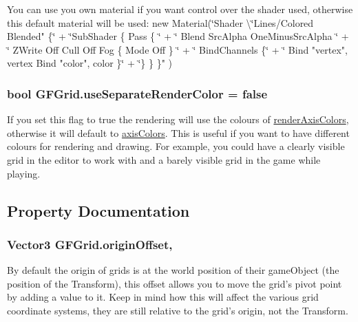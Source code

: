 You can use you own material if you want control over the shader used, otherwise this default material will be used\+: {\ttfamily  new Material(\char`\"{}\+Shader \textbackslash{}\char`\"{}Lines/\+Colored Blended" \{\char`\"{} +
    \char`\"{}Sub\+Shader \{ Pass \{ \char`\"{} +
    \char`\"{} Blend Src\+Alpha One\+Minus\+Src\+Alpha \char`\"{} +
    \char`\"{} Z\+Write Off Cull Off Fog \{ Mode Off \} \char`\"{} +
    \char`\"{} Bind\+Channels \{\char`\"{} +
    \char`\"{} Bind "vertex", vertex Bind "color", color \}\char`\"{} +
    \char`\"{}\} \} \}" ) } \hypertarget{class_g_f_grid_aeb78dcbc2890d20556958c994b95b000_aeb78dcbc2890d20556958c994b95b000}{
\subsubsection[{use\+Separate\+Render\+Color}]{\setlength{\rightskip}{0pt plus 5cm}bool G\+F\+Grid.\+use\+Separate\+Render\+Color = false}}\label{class_g_f_grid_aeb78dcbc2890d20556958c994b95b000_aeb78dcbc2890d20556958c994b95b000}
If you set this flag to {\ttfamily true} the rendering will use the colours of \hyperlink{class_g_f_grid_a8a822dbae0fa74657a7beed9761a0e89_a8a822dbae0fa74657a7beed9761a0e89}{render\+Axis\+Colors}, otherwise it will default to \hyperlink{class_g_f_grid_aa0dc7222dee5910e8df47e133f719309_aa0dc7222dee5910e8df47e133f719309}{axis\+Colors}. This is useful if you want to have different colours for rendering and drawing. For example, you could have a clearly visible grid in the editor to work with and a barely visible grid in the game while playing. 

\subsection{Property Documentation}
\hypertarget{class_g_f_grid_a6fb374bcb7d726ff28e3f14817260d6c_a6fb374bcb7d726ff28e3f14817260d6c}{
\subsubsection[{origin\+Offset}]{\setlength{\rightskip}{0pt plus 5cm}Vector3 G\+F\+Grid.\+origin\+Offset\hspace{0.3cm}{\ttfamily [get]}, {\ttfamily [set]}}}\label{class_g_f_grid_a6fb374bcb7d726ff28e3f14817260d6c_a6fb374bcb7d726ff28e3f14817260d6c}
By default the origin of grids is at the world position of their game\+Object (the position of the Transform), this offset allows you to move the grid's pivot point by adding a value to it. Keep in mind how this will affect the various grid coordinate systems, they are still relative to the grid's origin, not the Transform.

